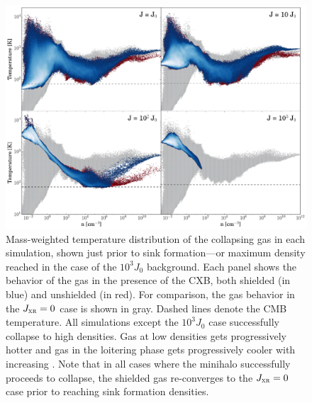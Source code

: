 \documentclass[../thesis.tex]{subfiles}
\begin{document}
\begin{figure}
  \begin{center}
    \includegraphics[width=\columnwidth]{figures/phase_diagrams/temp}
    \caption{Mass-weighted temperature distribution of the collapsing gas in each simulation, shown just prior to sink formation---or maximum density reached in the case of the $10^3 J_0$ background. Each panel shows the behavior of the gas in the presence of the CXB, both shielded (in blue) and unshielded (in red). For comparison, the gas behavior in the $J_{\textsc{xr}}=0$ case is shown in gray.  Dashed lines denote the CMB temperature. All simulations except the $10^3 J_0$ case successfully collapse to high densities.  Gas at low densities gets progressively hotter and gas in the loitering phase gets progressively cooler with increasing \jxr. Note that in all cases where the minihalo successfully proceeds to collapse, the shielded gas re-converges to the $J_{\textsc{xr}}=0$ case prior to reaching sink formation densities.}
    \label{Tdens}
  \end{center}
\end{figure}
\end{document}
